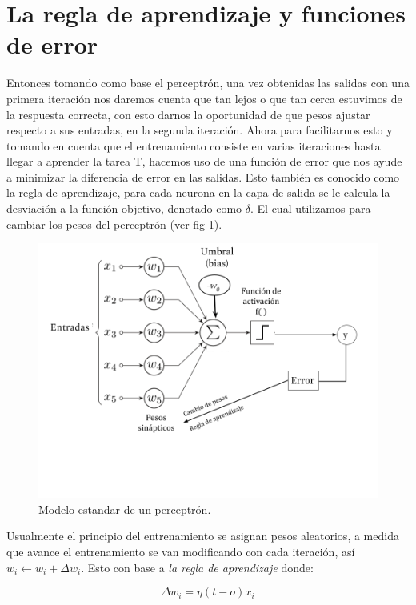 \section{La regla de aprendizaje y funciones de error}

Entonces tomando como base el perceptrón, una vez obtenidas las salidas con una primera iteración nos daremos cuenta que tan lejos o que tan cerca estuvimos de la respuesta correcta, con esto darnos la oportunidad de que pesos ajustar respecto a sus entradas, en la segunda iteración. Ahora para facilitarnos esto y tomando en cuenta que el entrenamiento consiste en varias iteraciones hasta llegar a aprender la tarea T, hacemos uso de una función de error que nos ayude a minimizar la diferencia de error en las salidas. Esto también es conocido como la regla de aprendizaje, para cada neurona en la capa de salida se le calcula la desviación a la función objetivo, denotado como $\delta$. El cual utilizamos para cambiar los pesos del perceptrón (ver fig \ref{fig:errorP}). 

\begin{figure}[h]
 \centering
 \includegraphics[scale=0.5]{../Figuras/ErrorPerceptron.png}
 \caption{Modelo estandar de un perceptrón.}
 \label{fig:errorP}
\end{figure}

Usualmente el principio del entrenamiento se asignan pesos aleatorios, a medida que avance el entrenamiento se van modificando con cada iteración, así \(w_{i} \leftarrow w_{i} + \Delta w_{i}\). Esto con base a \emph{la regla de aprendizaje} donde: 

\begin{equation}
 \Delta w_{i} = \eta(t - o)x_{i}
\end{equation}

